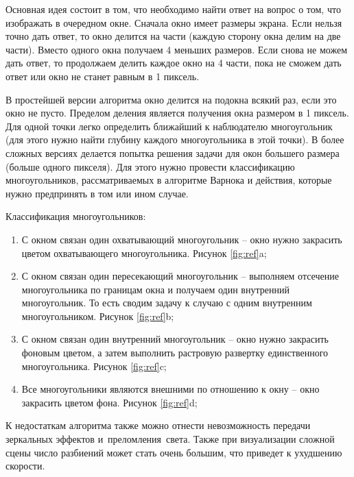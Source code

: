 Основная идея состоит в том, что необходимо найти ответ на вопрос о том, что изображать в очередном окне. Сначала окно имеет размеры экрана. Если нельзя точно дать ответ, то окно делится на части (каждую сторону окна делим на две части). Вместо одного окна получаем 4 меньших размеров. Если снова не можем дать ответ, то продолжаем делить каждое окно на 4 части, пока не сможем дать ответ или окно не станет равным в 1 пиксель.

В простейшей версии алгоритма окно делится на подокна всякий раз, если это окно не пусто. Пределом деления является получения окна размером в 1 пиксель. Для одной точки легко определить ближайший к наблюдателю многоугольник (для этого нужно найти глубину каждого многоугольника в этой точки). В более сложных версиях делается попытка решения задачи для окон большего размера (больше одного пикселя). Для этого нужно провести классификацию многоугольников, рассматриваемых в алгоритме Варнока и действия, которые нужно предпринять в том или ином случае.

Классификация многоугольников:

\begin{enumerate}
	\item С окном связан один охватывающий многоугольник -- окно нужно закрасить цветом охватывающего многоугольника.  Рисунок \ref{fig:ref}a;
	\item С окном связан один пересекающий многоугольник -- выполняем отсечение многоугольника по границам окна и получаем один внутренний многоугольник. То есть сводим задачу к случаю с одним внутренним многоугольником.  Рисунок \ref{fig:ref}b;
	\item С окном связан один внутренний многоугольник -- окно нужно закрасить фоновым цветом, а затем выполнить растровую развертку единственного многоугольника. Рисунок \ref{fig:ref}c;
	\item Все многоугольники являются внешними по отношению к окну -- окно закрасить цветом фона.  Рисунок \ref{fig:ref}d;
\end{enumerate}

\begin{figure}[ht!]
\end{figure}

К недостаткам алгоритма также можно отнести невозможность передачи зеркальных эффектов и преломления света. Также при визуализации сложной сцены число разбиений может стать очень большим, что приведет к ухудшению скорости.

